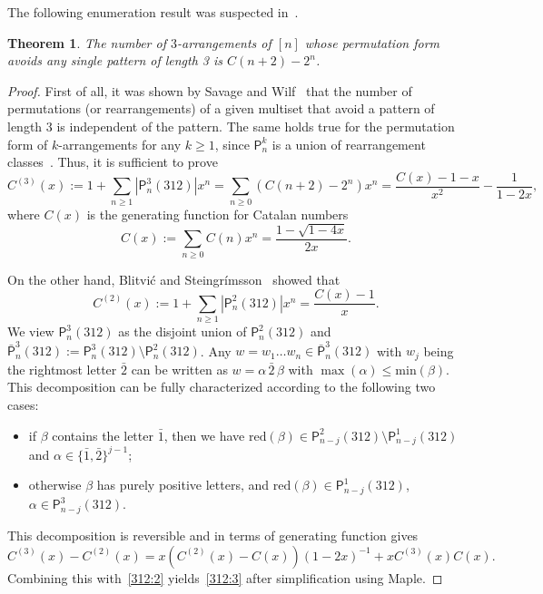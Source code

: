 \documentclass[12pt]{amsart}
\numberwithin{equation}{section}
\theoremstyle{plain}
\newtheorem{theorem}{Theorem}[section]
\theoremstyle{definition}
\renewcommand\P{\mathsf{P}}
\def\reduction{\mathrm{red}}
\def\max{\mathrm{max}}
\def\min{\mathrm{min}}
\def\max{\operatorname{max}}
\def\neg#1{{{{\bar#1}}}}
\begin{document}
The following enumeration result was suspected in~\cite[Conj.~2]{bs}.
\begin{theorem}
The number of $3$-arrangements of $[n]$ whose permutation form avoids any single pattern of length 3 is $C(n + 2)-2^n$.
\end{theorem}
\begin{proof}
First of all, it was shown by Savage and Wilf~\cite[Thm.~3]{sav} that the number of permutations (or rearrangements) of a given multiset that avoid a pattern of length $3$ is independent of the pattern. The same holds true for the permutation form of $k$-arrangements for any $k\geq1$, since $\P_n^k$ is  a union of
rearrangement classes~\cite[Prop.~3]{bs}. Thus, it is sufficient to prove 
\begin{equation}\label{312:3}
C^{(3)}(x):=1+\sum_{n\geq1}|\P_n^3(312)|x^n=\sum_{n\geq0}(C(n+2)-2^n)x^n=\frac{C(x)-1-x}{x^2}-\frac{1}{1-2x},
\end{equation}
where $C(x)$ is the generating function for Catalan numbers
$$
C(x):=\sum_{n\geq0}C(n)x^n=\frac{1-\sqrt{1-4x}}{2x}. 
$$

On the other hand, Blitvi\'c and Steingr\'imsson~\cite[Prop.~6]{bs} showed that 
\begin{equation}\label{312:2}
C^{(2)}(x):=1+\sum_{n\geq1}|\P_n^2(312)|x^n=\frac{C(x)-1}{x}. 
\end{equation}
We view $\P_n^3(312)$ as the disjoint union of $\P_n^2(312)$ and $\bar{\P}_n^3(312):=\P_n^3(312)\setminus\P_n^2(312)$.  
Any $w=w_1\ldots w_n\in\bar{\P}_n^3(312)$ with $w_j$ being the rightmost letter $\neg2$ can be written  as $w=\alpha\,\neg2\,\beta$ with $\max(\alpha)\leq \min(\beta)$. This decomposition can be fully characterized according to the following two cases:
\begin{itemize}
\item if $\beta$ contains the letter $\neg 1$, then we have $\reduction(\beta)\in\P_{n-j}^2(312)\setminus\P_{n-j}^1(312)$ and $\alpha\in\{\neg1,\neg2\}^{j-1}$;
\item otherwise $\beta$ has purely positive letters, and $\reduction(\beta)\in\P_{n-j}^1(312)$, $\alpha\in\P_{n-j}^3(312)$. 
\end{itemize}
This decomposition is reversible and in terms of generating function gives 
$$
C^{(3)}(x)-C^{(2)}(x)=x(C^{(2)}(x)-C(x))(1-2x)^{-1}+xC^{(3)}(x)C(x).
$$
Combining this with~\eqref{312:2} yields~\eqref{312:3} after simplification using Maple. 
\end{proof}
\end{document}
